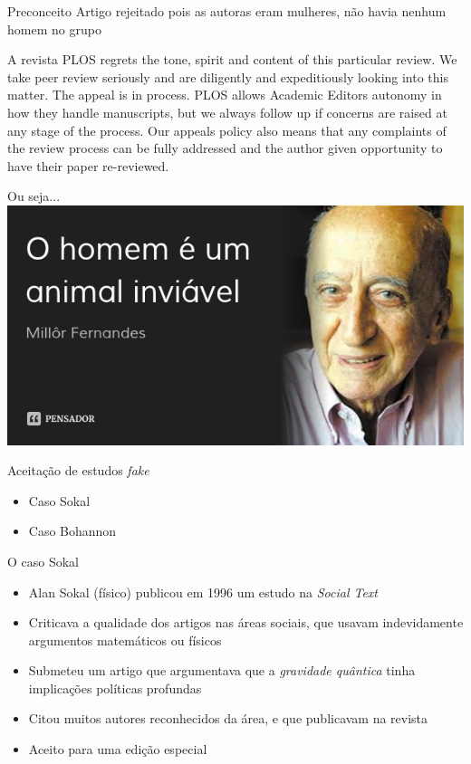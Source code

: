 \documentclass{beamer}
\begin{document}
\begin{frame}{Preconceito}
  Artigo rejeitado pois as autoras eram mulheres, não havia nenhum
  homem no grupo
    \begin{block}{A revista}
      PLOS regrets the tone, spirit and content of this particular
      review. We take peer review seriously and are diligently and
      expeditiously looking into this matter. The appeal is in
      process. PLOS allows Academic Editors autonomy in how they
      handle manuscripts, but we always follow up if concerns are
      raised at any stage of the process. Our appeals policy also
      means that any complaints of the review process can be fully
      addressed and the author given opportunity to have their paper
      re-reviewed.
    \end{block}
\end{frame}

\begin{frame}{Ou seja...}
  \includegraphics[width=\textwidth]{Etapas/millor}
\end{frame}

\begin{frame}{Aceitação de estudos {\em fake}}
  \begin{itemize}
  \item Caso Sokal
  \item Caso Bohannon
  \end{itemize}
\end{frame}

\begin{frame}{O caso Sokal}
  \begin{itemize}
  \item Alan Sokal (físico) publicou em 1996 um estudo na {\em Social
      Text}
  \item Criticava a qualidade dos artigos nas áreas sociais, que
    usavam indevidamente argumentos matemáticos ou físicos
  \item Submeteu um artigo que argumentava que a {\em gravidade
      quântica} tinha implicações políticas profundas
  \item Citou muitos autores reconhecidos da área, e que publicavam na
    revista
  \item Aceito para uma edição especial
  \end{itemize}
\end{frame}
\end{document}
